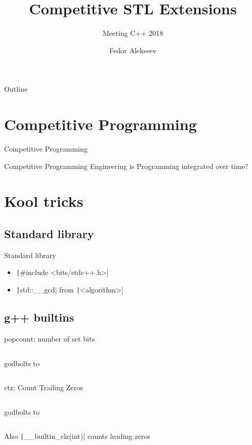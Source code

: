 \documentclass[12pt,notes,hyperref={unicode},aspectratio=169]{beamer}
\subtitle{Meeting C++ 2018}
\title{Competitive STL Extensions}
\author{Fedor Alekseev}
\institute{Moscow IPT: My pity}
\date{}
\begin{document}
\begin{frame}
  \titlepage
\end{frame}

\begin{frame}{Outline}
  \tableofcontents
\end{frame}

\section{Competitive Programming}
\begin{frame}{Competitive Programming}
\end{frame}

\begin{frame}{Competitive Programming}
  Engineering is Programming integrated over time?
\end{frame}

\section{Kool tricks}

\subsection{Standard library}
\begin{frame}[fragile]{Standard library}
  \begin{itemize}
    \item<1-> \texttt|#include <bits/stdc++.h>|
    \item<2-> \texttt|std::__gcd| from \texttt|<algorithm>|
  \end{itemize}
\end{frame}

\subsection{g++ builtins}

\begin{frame}[fragile]{popcount: number of set bits}
  \inputminted{c++}{popcnt.cc}
  godbolts to
  \inputminted{asm}{popcnt.asm}
\end{frame}

\begin{frame}[fragile]{ctz: Count Trailing Zeros}
  \inputminted{c++}{ctz.cc}
  godbolts to
  \inputminted{asm}{ctz.asm}

  Also \texttt|__builtin_clz(int)| counts leading zeros
\end{frame}
\end{document}
